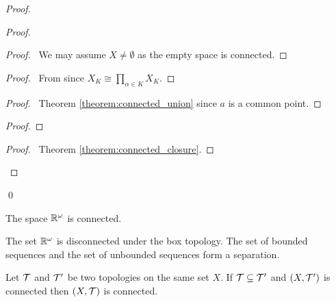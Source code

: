 \begin{proof}
\begin{proof}
\begin{proof}
            \pf\ We may assume $X \neq \emptyset$ as the empty space is connected.
        \end{proof}
        \begin{proof}
            \pf\ From  since $X_K \cong \prod_{\alpha \in K} X_K$.
        \end{proof}
        \begin{proof}
            \pf\ Theorem \ref{theorem:connected_union} since $a$ is a common point.
        \end{proof}
        \begin{proof}
        \end{proof}
        \begin{proof}
            \pf\ Theorem \ref{theorem:connected_closure}.
        \end{proof}          
    \end{proof}
    \qed
\end{proof}

\begin{corollary}
    The space $\mathbb{R}^\omega$ is connected.
\end{corollary}

\begin{example}
    The set $\mathbb{R}^\omega$ is disconnected under the box topology. The set of bounded sequences and the set of unbounded sequences form
    a separation.
\end{example}

\begin{proposition}
    Let $\mathcal{T}$ and $\mathcal{T}'$ be two topologies on the same set $X$. If $\mathcal{T} \subseteq \mathcal{T}'$ and $(X, \mathcal{T}')$ is connected then $(X, \mathcal{T})$ is connected.
\end{proposition}

